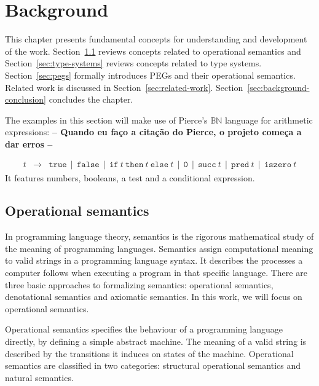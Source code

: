 \chapter{Background}\label{chap:background}

This chapter presents fundamental concepts for understanding and development of the 
work. Section~\ref{sec:operational-semantics} reviews concepts related to operational 
semantics and Section~\ref{sec:type-systems} reviews concepts related to type systems.
Section~\ref{sec:pegs} formally introduces PEGs and their operational semantics. 
Related work is discussed in Section~\ref{sec:related-work}.
Section~\ref{sec:background-conclusion} concludes the chapter.

The examples in this section will make use of Pierce's
\(\mathbb{B}\mathbb{N}\) language for arithmetic expressions:
\textbf{-- Quando eu faço a citação do Pierce, o projeto começa a dar erros --}

\[
    \begin{array}{lcl}
        t & \to & \texttt{true} \, \mid \, \texttt{false} \, 
                \mid \, \texttt{if} \: t \: \texttt{then} \: t \: \texttt{else} \: t \,
                \mid \, \texttt{0} \, \mid \, \texttt{succ} \: t \, 
                \mid \, \texttt{pred} \: t \, \mid \, \texttt{iszero} \: t
    \end{array}
\]
It features numbers, booleans, a test and a conditional expression.

\section{Operational semantics}\label{sec:operational-semantics}

In programming language theory, semantics is the rigorous mathematical study of
the meaning of programming languages. Semantics assign computational meaning to 
valid strings in a programming language syntax. It describes the processes a 
computer follows when executing a program in that specific language. There are
three basic approaches to formalizing semantics: operational semantics, denotational 
semantics and axiomatic semantics.
In this work, we will focus on operational semantics. 

Operational semantics specifies the behaviour of a programming language directly,
by defining a simple abstract machine. The meaning of a valid string is described 
by the transitions it induces on states of the machine. Operational semantics
are classified in two categories: structural operational semantics and natural
semantics.

